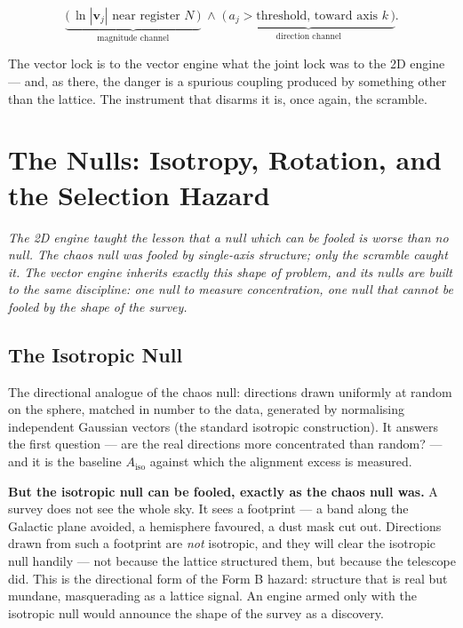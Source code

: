 \documentclass[11pt, letterpaper, openany]{book}
\begin{document}
\[
\underbrace{\big(\,\ln|\mathbf{v}_j| \text{ near register } N\,\big)}_{\text{magnitude channel}}
\;\wedge\;
\underbrace{\big(\,a_j > \text{threshold, toward axis } k\,\big)}_{\text{direction channel}} .
\]

The vector lock is to the vector engine what the joint lock was to the 2D engine --- and, as there, the
danger is a spurious coupling produced by something other than the lattice. The instrument that disarms it
is, once again, the scramble.

\chapter{The Nulls: Isotropy, Rotation, and the Selection Hazard}

\begin{center}
\textit{The 2D engine taught the lesson that a null which can be fooled is worse than no null. The chaos
null was fooled by single-axis structure; only the scramble caught it. The vector engine inherits exactly
this shape of problem, and its nulls are built to the same discipline: one null to measure concentration,
one null that cannot be fooled by the shape of the survey.}
\end{center}

\section{The Isotropic Null}

The directional analogue of the chaos null: directions drawn uniformly at random on the sphere, matched in
number to the data, generated by normalising independent Gaussian vectors (the standard isotropic
construction). It answers the first question --- are the real directions more concentrated than random? ---
and it is the baseline $A_{\mathrm{iso}}$ against which the alignment excess is measured.

\begin{formbox}
\textbf{But the isotropic null can be fooled, exactly as the chaos null was.} A survey does not see the
whole sky. It sees a footprint --- a band along the Galactic plane avoided, a hemisphere favoured, a dust
mask cut out. Directions drawn from such a footprint are \emph{not} isotropic, and they will clear the
isotropic null handily --- not because the lattice structured them, but because the telescope did. This is
the directional form of the Form B hazard: structure that is real but mundane, masquerading as a lattice
signal. An engine armed only with the isotropic null would announce the shape of the survey as a discovery.
\end{formbox}
\end{document}
